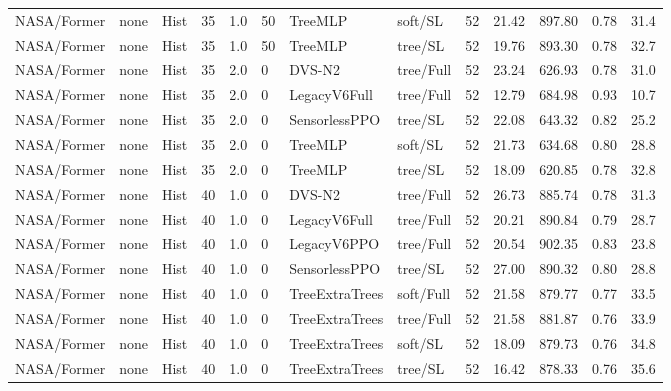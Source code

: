 \documentclass[10pt,a4paper]{article}
\begin{document}
\begin{landscape}
\begin{longtable}{llllllllrrrrr}
NASA/Former & none & Hist & 35 & 1.0 & 50 & TreeMLP & soft/SL & 52 & 21.42 & 897.80 & 0.78 & 31.4 \\

NASA/Former & none & Hist & 35 & 1.0 & 50 & TreeMLP & tree/SL & 52 & 19.76 & 893.30 & 0.78 & 32.7 \\

NASA/Former & none & Hist & 35 & 2.0 & 0 & DVS-N2 & tree/Full & 52 & 23.24 & 626.93 & 0.78 & 31.0 \\

NASA/Former & none & Hist & 35 & 2.0 & 0 & LegacyV6Full & tree/Full & 52 & 12.79 & 684.98 & 0.93 & 10.7 \\

NASA/Former & none & Hist & 35 & 2.0 & 0 & SensorlessPPO & tree/SL & 52 & 22.08 & 643.32 & 0.82 & 25.2 \\

NASA/Former & none & Hist & 35 & 2.0 & 0 & TreeMLP & soft/SL & 52 & 21.73 & 634.68 & 0.80 & 28.8 \\

NASA/Former & none & Hist & 35 & 2.0 & 0 & TreeMLP & tree/SL & 52 & 18.09 & 620.85 & 0.78 & 32.8 \\

NASA/Former & none & Hist & 40 & 1.0 & 0 & DVS-N2 & tree/Full & 52 & 26.73 & 885.74 & 0.78 & 31.3 \\

NASA/Former & none & Hist & 40 & 1.0 & 0 & LegacyV6Full & tree/Full & 52 & 20.21 & 890.84 & 0.79 & 28.7 \\

NASA/Former & none & Hist & 40 & 1.0 & 0 & LegacyV6PPO & tree/Full & 52 & 20.54 & 902.35 & 0.83 & 23.8 \\

NASA/Former & none & Hist & 40 & 1.0 & 0 & SensorlessPPO & tree/SL & 52 & 27.00 & 890.32 & 0.80 & 28.8 \\

NASA/Former & none & Hist & 40 & 1.0 & 0 & TreeExtraTrees & soft/Full & 52 & 21.58 & 879.77 & 0.77 & 33.5 \\

NASA/Former & none & Hist & 40 & 1.0 & 0 & TreeExtraTrees & tree/Full & 52 & 21.58 & 881.87 & 0.76 & 33.9 \\

NASA/Former & none & Hist & 40 & 1.0 & 0 & TreeExtraTrees & soft/SL & 52 & 18.09 & 879.73 & 0.76 & 34.8 \\

NASA/Former & none & Hist & 40 & 1.0 & 0 & TreeExtraTrees & tree/SL & 52 & 16.42 & 878.33 & 0.76 & 35.6 \\


\end{longtable}
\end{landscape}
\end{document}
